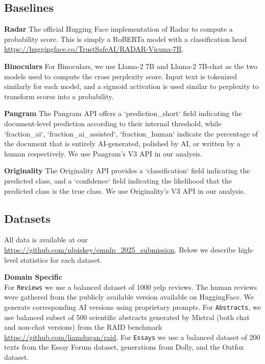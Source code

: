 \documentclass[11pt]{article}
\begin{document}
\subsection{Baselines}
\textbf{Radar} The official Hugging Face implementation of Radar to compute a probability score. This is simply a RoBERTa model with a classification head \href{implementation}{https://huggingface.co/TrustSafeAI/RADAR-Vicuna-7B}. 

\noindent \textbf{Binoculars}
For Binoculars, we use Llama-2 7B and Llama-2 7B-chat as the two models used to compute the cross perplexity score. Input text is tokenized similarly for each model, and a sigmoid activation is used similar to perplexity to transform scores into a probability.

\noindent \textbf{Pangram} The Pangram API offers a `prediction\_short` field indicating the document-level prediction according to their internal threshold, while `fraction\_ai`, `fraction\_ai\_assisted`, `fraction\_human` indicate the percentage of the document that is entirely AI-generated, polished by AI, or written by a human respectively.
We use Pangram's V3 API in our analysis.

\noindent \textbf{Originality} The Originality API provides a `classification` field indicating the predicted class, and a `confidence` field indicating the likelihood that the predicted class is the true class. We use Originality's V3 API in our analysis.


\subsection{Datasets}
All data is available at our \url{https://github.com/nlpiskey/emnlp_2025_submission}. Below we describe high-level statistics for each dataset.
\label{sec:case_study_dataset_details}

\textbf{Domain Specific} \\ For \texttt{Reviews} we use a balanced dataset of 1000 yelp reviews. The human reviews were gathered from the publicly available version available on HuggingFace.
We generate corresponding AI versions using proprietary prompts. For \texttt{Abstracts}, we use balanced subset of 500 scientific abstracts generated by Mistral (both chat and non-chat versions) from the RAID benchmark \href{dataset}{https://github.com/liamdugan/raid}. 
For \texttt{Essays} we use a balanced dataset of 200 texts from the Essay Forum dataset, generations from Dolly, and the Outfox dataset.
\end{document}
